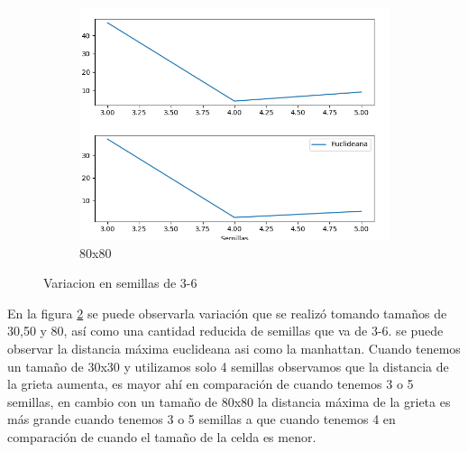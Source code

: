 \documentclass{article}
\begin{document}
\begin{figure}[H]
\begin{subfigure}[b]{0.7\linewidth}
           \includegraphics[width=\linewidth]{80x80.png}
           \caption{80x80}
           \label{fig:westminster_aerea}
        \end{subfigure}
        \caption{Variacion en semillas de 3-6}
        \label{f1}
\end{figure}

En la figura \ref{f1}  se puede observarla variaci\'on que se realiz\'o tomando tama\~nos de 30,50 y 80, as\'i como una cantidad reducida de semillas que va de 3-6. se puede observar la distancia m\'axima euclideana asi como la manhattan.
Cuando tenemos un tama\~no de 30x30 y utilizamos solo 4 semillas observamos que la distancia de la grieta aumenta, es mayor ah\'i en comparaci\'on de cuando tenemos 3 o 5 semillas, en cambio con un tama\~no de 80x80 la distancia m\'axima de la grieta es m\'as grande cuando tenemos 3 o 5 semillas a que cuando tenemos 4 en comparaci\'on de cuando el tama\~no de la celda es menor.
\end{document}
